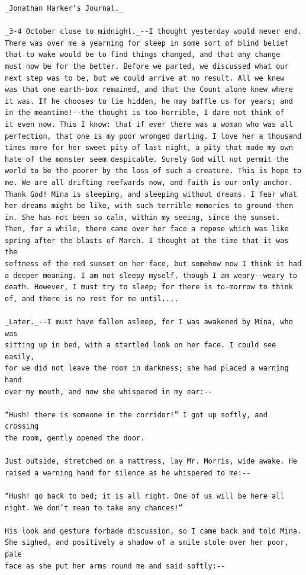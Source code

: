 \documentclass{article}
\begin{document}
\begin{verbatim}
_Jonathan Harker’s Journal._

_3-4 October close to midnight._--I thought yesterday would never end.
There was over me a yearning for sleep in some sort of blind belief
that to wake would be to find things changed, and that any change
must now be for the better. Before we parted, we discussed what our
next step was to be, but we could arrive at no result. All we knew
was that one earth-box remained, and that the Count alone knew where
it was. If he chooses to lie hidden, he may baffle us for years; and
in the meantime!--the thought is too horrible, I dare not think of
it even now. This I know: that if ever there was a woman who was all
perfection, that one is my poor wronged darling. I love her a thousand
times more for her sweet pity of last night, a pity that made my own
hate of the monster seem despicable. Surely God will not permit the
world to be the poorer by the loss of such a creature. This is hope to
me. We are all drifting reefwards now, and faith is our only anchor.
Thank God! Mina is sleeping, and sleeping without dreams. I fear what
her dreams might be like, with such terrible memories to ground them
in. She has not been so calm, within my seeing, since the sunset.
Then, for a while, there came over her face a repose which was like
spring after the blasts of March. I thought at the time that it was the
softness of the red sunset on her face, but somehow now I think it had
a deeper meaning. I am not sleepy myself, though I am weary--weary to
death. However, I must try to sleep; for there is to-morrow to think
of, and there is no rest for me until....

_Later._--I must have fallen asleep, for I was awakened by Mina, who was
sitting up in bed, with a startled look on her face. I could see easily,
for we did not leave the room in darkness; she had placed a warning hand
over my mouth, and now she whispered in my ear:--

“Hush! there is someone in the corridor!” I got up softly, and crossing
the room, gently opened the door.

Just outside, stretched on a mattress, lay Mr. Morris, wide awake. He
raised a warning hand for silence as he whispered to me:--

“Hush! go back to bed; it is all right. One of us will be here all
night. We don’t mean to take any chances!”

His look and gesture forbade discussion, so I came back and told Mina.
She sighed, and positively a shadow of a smile stole over her poor, pale
face as she put her arms round me and said softly:--


\end{verbatim}
\end{document}
